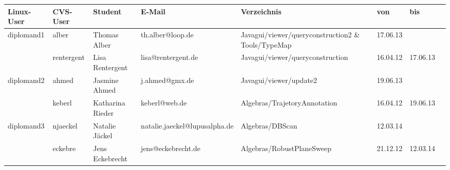 \documentclass[a4paper,8pt,landscape]{scrartcl}
\begin{document}
\begin{longtabu}to 1\textwidth{|l|l|l|l|l|l|l|l|}
  \hline \hline
\textbf{Linux-User}        &\textbf{CVS-User}        &\textbf{Student}&\textbf{E-Mail}       &\textbf{Verzeichnis}              &\textbf{von} &\textbf{bis}\\
\hline
\hline\endhead
{}diplomand1   &alber  &Thomas Alber    &th.alber@loop.de      &Javagui/viewer/queryconstruction2 \& Tools/TypeMap &17.06.13     &\\
            &rentergent               &Lisa Rentergent &lisa@rentergent.de    &Javagui/viewer/queryconstruction  &16.04.12     &17.06.13\\
\hline
{}diplomand2   &ahmed  &Jasmine Ahmed   &j.ahmed@gmx.de        &Javagui/viewer/update2            &19.06.13     &\\
            &keberl                   &Katharina Rieder&keberl@web.de         &Algebras/TrajetoryAnnotation      &16.04.12     &19.06.13\\
\hline
{}diplomand3   &njaeckel&Natalie J\"ackel&natalie.jaeckel@lupusalpha.de&Algebras/DBScan           &12.03.14     &\\
            &eckebre                  &Jens Eckebrecht &jens@eckebrecht.de    &Algebras/RobustPlaneSweep         &21.12.12     &12.03.14\\

\end{longtabu}
\end{document}
